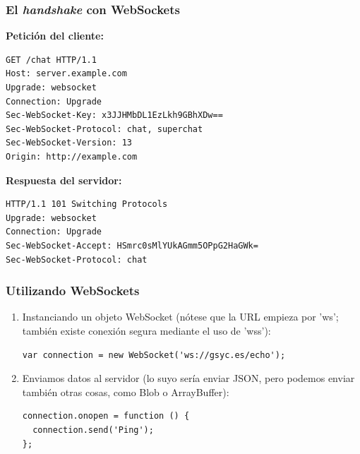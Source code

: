 \begin{frame}[fragile]
\frametitle{El \emph{handshake} con WebSockets}

{\bf Petición del cliente:}

\begin{verbatim}
GET /chat HTTP/1.1
Host: server.example.com
Upgrade: websocket
Connection: Upgrade
Sec-WebSocket-Key: x3JJHMbDL1EzLkh9GBhXDw==
Sec-WebSocket-Protocol: chat, superchat
Sec-WebSocket-Version: 13
Origin: http://example.com
\end{verbatim}

{\bf Respuesta del servidor:}

\begin{verbatim}
HTTP/1.1 101 Switching Protocols
Upgrade: websocket
Connection: Upgrade
Sec-WebSocket-Accept: HSmrc0sMlYUkAGmm5OPpG2HaGWk=
Sec-WebSocket-Protocol: chat
\end{verbatim}

\end{frame}



\begin{frame}[fragile]
\frametitle{Utilizando WebSockets}

\begin{enumerate}
  \item Instanciando un objeto WebSocket (nótese que la URL empieza por 'ws'; también existe conexión segura mediante el uso de 'wss'):
\begin{verbatim}
var connection = new WebSocket('ws://gsyc.es/echo');
\end{verbatim}

  \item Enviamos datos al servidor (lo suyo sería enviar JSON, pero podemos enviar también otras cosas, como Blob o ArrayBuffer):
\begin{verbatim}
connection.onopen = function () {
  connection.send('Ping'); 
};
\end{verbatim}

\end{enumerate}

\end{frame}




